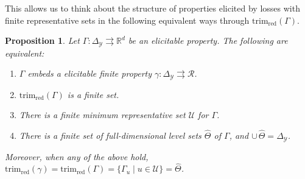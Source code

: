 \documentclass[11pt]{article}
\newcommand{\Comments}{1}
\newcommand{\mynote}[2]{\ifnum\Comments=1\textcolor{#1}{#2}\fi}
\newcommand{\mytodo}[2]{\ifnum\Comments=1%
  \todo[linecolor=#1!80!black,backgroundcolor=#1,bordercolor=#1!80!black]{#2}\fi}
\newcommand{\raft}[1]{\mytodo{green!20!white}{RF: #1}}
\newcommand{\jessie}[1]{\mynote{teal}{[JF: #1]}}
\newcommand{\jessiet}[1]{\mytodo{teal!20!white}{JF: #1}}
\newcommand{\reals}{\mathbb{R}}
\newcommand{\simplex}{\Delta_\Y}
\newcommand{\R}{\mathcal{R}}
\newcommand{\U}{\mathcal{U}}
\newcommand{\Y}{\mathcal{Y}}
\newcommand{\toto}{\rightrightarrows}
\newcommand{\red}{\mathrm{red}}
\newcommand{\trimred}{\mathrm{trim}_\red}
\newtheorem{proposition}{Proposition}
\begin{document}
This allows us to think about the structure of properties elicited by losses with finite representative sets in the following equivalent ways through $\trimred(\Gamma)$.

\begin{proposition}\label{prop:embed-trim}
  Let $\Gamma:\simplex\toto\reals^d$ be an elicitable property.
  The following are equivalent:
  \begin{enumerate}\setlength{\itemsep}{0pt}
  \item $\Gamma$ embeds a elicitable finite property $\gamma:\simplex \toto \R$.
  \item $\trimred(\Gamma)$ is a finite set.%
  \item There is a finite minimum representative set $\U$ for $\Gamma$.
  \item There is a finite set of full-dimensional level sets $\hat\Theta$ of $\Gamma$, and $\cup\,\hat\Theta = \simplex$.
  \end{enumerate}
  Moreover, when any of the above hold, $\trimred(\gamma) = \trimred(\Gamma) = \{\Gamma_u \mid u\in\U\} = \hat\Theta$.
\end{proposition}
\end{document}
